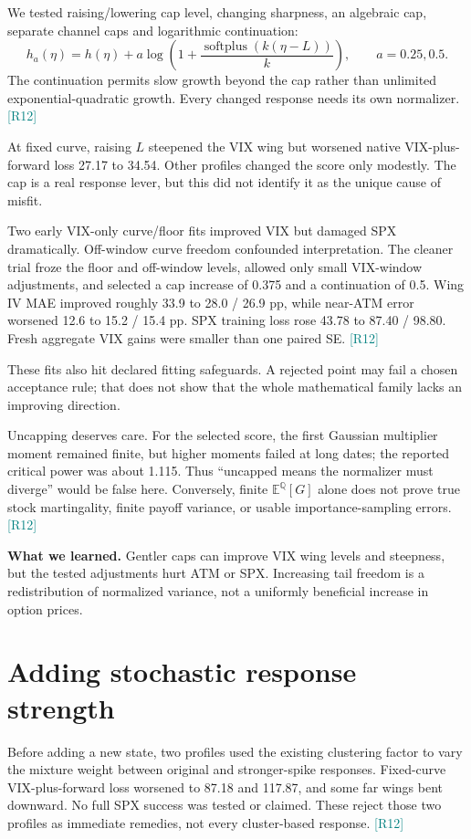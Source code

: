\documentclass[11pt,a4paper]{article}
\newcommand{\E}{\mathbb E^{\mathbb Q}}
\newcommand{\splus}{\operatorname{softplus}}
\newcommand{\src}[1]{\textcolor{teal}{\small[#1]}}
\newcommand{\lesson}[1]{\par\smallskip\noindent\colorbox{teal!9}{\parbox{\dimexpr\linewidth-2\fboxsep}{\textbf{What we learned.} #1}}\par\smallskip}
\begin{document}
We tested raising/lowering cap level, changing sharpness, an algebraic cap, separate channel caps and logarithmic continuation:
\begin{equation}
h_a(\eta)=h(\eta)+a\log\!\left(1+\frac{\splus(k(\eta-L))}{k}\right),\qquad a=0.25,0.5.
\end{equation}
The continuation permits slow growth beyond the cap rather than unlimited exponential-quadratic growth. Every changed response needs its own normalizer. \src{R12}

At fixed curve, raising $L$ steepened the VIX wing but worsened native VIX-plus-forward loss 27.17 to 34.54. Other profiles changed the score only modestly. The cap is a real response lever, but this did not identify it as the unique cause of misfit.

Two early VIX-only curve/floor fits improved VIX but damaged SPX dramatically. Off-window curve freedom confounded interpretation. The cleaner trial froze the floor and off-window levels, allowed only small VIX-window adjustments, and selected a cap increase of 0.375 and a continuation of 0.5. Wing IV MAE improved roughly 33.9 to 28.0 / 26.9 pp, while near-ATM error worsened 12.6 to 15.2 / 15.4 pp. SPX training loss rose 43.78 to 87.40 / 98.80. Fresh aggregate VIX gains were smaller than one paired SE. \src{R12}

These fits also hit declared fitting safeguards. A rejected point may fail a chosen acceptance rule; that does not show that the whole mathematical family lacks an improving direction.

Uncapping deserves care. For the selected score, the first Gaussian multiplier moment remained finite, but higher moments failed at long dates; the reported critical power was about 1.115. Thus ``uncapped means the normalizer must diverge'' would be false here. Conversely, finite $\E[G]$ alone does not prove true stock martingality, finite payoff variance, or usable importance-sampling errors. \src{R12}

\lesson{Gentler caps can improve VIX wing levels and steepness, but the tested adjustments hurt ATM or SPX. Increasing tail freedom is a redistribution of normalized variance, not a uniformly beneficial increase in option prices.}

\section{Adding stochastic response strength}
Before adding a new state, two profiles used the existing clustering factor to vary the mixture weight between original and stronger-spike responses. Fixed-curve VIX-plus-forward loss worsened to 87.18 and 117.87, and some far wings bent downward. No full SPX success was tested or claimed. These reject those two profiles as immediate remedies, not every cluster-based response. \src{R12}
\end{document}
